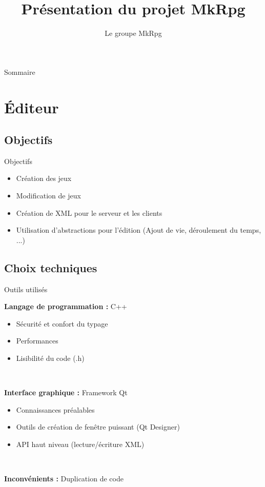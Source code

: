\documentclass[11pt]{beamer}
\author{Le groupe MkRpg}
\title{Présentation du projet MkRpg}
\begin{document}
\begin{frame}
\titlepage
\end{frame}

\begin{frame}{Sommaire}
\tableofcontents
\end{frame}

\section{Éditeur}

\subsection{Objectifs}
\begin{frame}{Objectifs}
\begin{itemize}
\item Création des jeux
\item Modification de jeux
\item Création de XML pour le serveur et les clients
\item Utilisation d'abstractions pour l'édition (Ajout de vie, déroulement du temps, ...)
\end{itemize}
\end{frame}



\subsection{Choix techniques}

\begin{frame}{Outils utilisés}

\textbf{Langage de programmation :}
C++
\begin{itemize}
\item Sécurité et confort du typage
\item Performances
\item Lisibilité du code (.h)
\end{itemize}

~


\textbf{Interface graphique :}
Framework Qt

\begin{itemize}
\item Connaissances préalables
\item Outils de création de fenêtre puissant (Qt Designer)
\item API haut niveau (lecture/écriture XML)
\end{itemize}

~

\textbf{Inconvénients :} Duplication de code
\end{frame}
\end{document}
